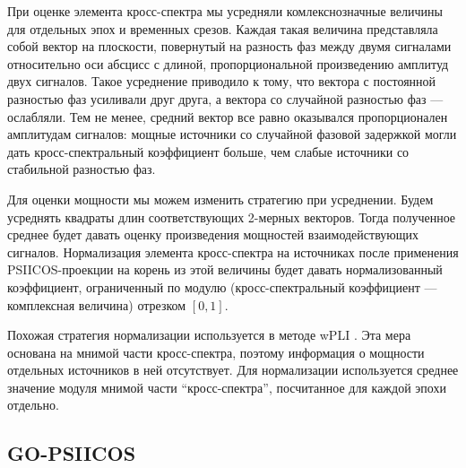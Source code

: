 При оценке элемента кросс-спектра мы усредняли комлекснозначные величины для
отдельных эпох и временных срезов.  Каждая такая величина представляла собой
вектор на плоскости, повернутый на разность фаз между двумя сигналами
относительно оси абсцисс с длиной, пропорциональной произведению амплитуд двух
сигналов.  Такое усреднение приводило к тому, что вектора с постоянной
разностью фаз усиливали друг друга, а вектора со случайной разностью фаз ---
ослабляли. Тем не менее, средний вектор все равно оказывался пропорционален
амплитудам сигналов: мощные источники со случайной фазовой задержкой могли дать
кросс-спектральный коэффициент больше, чем слабые источники со стабильной
разностью фаз.

Для оценки мощности мы можем изменить стратегию при усреднении. Будем усреднять
квадраты длин соответствующих 2-мерных векторов. Тогда полученное среднее
будет давать оценку произведения мощностей взаимодействующих сигналов.
Нормализация элемента кросс-спектра на источниках после применения PSIICOS-проекции
на корень из этой величины будет давать нормализованный коэффициент, ограниченный
по модулю (кросс-спектральный коэффициент --- комплексная величина) отрезком $[0, 1]$.

Похожая стратегия нормализации используется в методе wPLI \cite{wPLI}.
Эта мера основана на мнимой части кросс-спектра, поэтому информация о мощности
отдельных источников в ней отсутствует. Для нормализации используется
среднее значение модуля мнимой части ``кросс-спектра'', посчитанное для
каждой эпохи отдельно.

\subsection{GO-PSIICOS}
